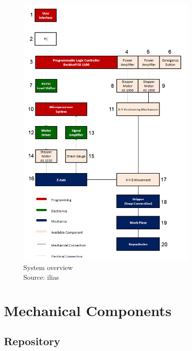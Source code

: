 \documentclass[a4paper,12pt]{scrreprt}
\begin{document}
\begin{figure}[H]
  \centering
   \includegraphics[width=0.8\textwidth]{pictures/SystemDesign}
   \caption[System overview]{System overview\\
	Source: ilias
  }
   \label{fig:system overview}
\end{figure} 





\chapter{Mechanical Components}

\section{\acs{Repository}}\label{sec:repository}
\end{document}
